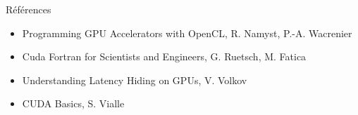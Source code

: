 \documentclass[11pt,mathserif]{beamer}
\newcommand{\liburu}{\faBook}
\begin{document}
\begin{frame}{Références}
\begin{itemize}[<+->]
  \item Programming GPU Accelerators with OpenCL, R. Namyst, P.-A. Wacrenier \href{https://raymond-namyst.emi.u-bordeaux.fr/ens/pap/PAP-GPU.pdf}{}
  \item[\liburu] Cuda Fortran for Scientists and Engineers, G. Ruetsch, M. Fatica
  \item Understanding Latency Hiding on GPUs, V. Volkov \href{http://www2.eecs.berkeley.edu/Pubs/TechRpts/2016/EECS-2016-143.pdf}{}
  \item CUDA Basics, S. Vialle \href{http://www.metz.supelec.fr/metz/personnel/vialle/course/PPS-5A-GPGPU/notes-de-cours-specifiques/PPS-GPU-02-CUDA-Basics-2spp.pdf}{}
\end{itemize}
\end{frame}
\end{document}
